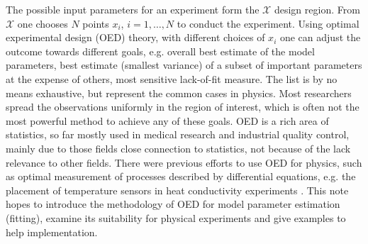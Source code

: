 \documentclass[12pt]{iopart}
\begin{document}
The possible input parameters for an experiment form the $\mathcal{X}$ design region. From $\mathcal{X}$ one chooses $N$ points $x_i$, $i = 1, \ldots, N$ to conduct the experiment. Using optimal experimental design (OED) theory, with different choices of $x_i$ one can adjust the outcome towards different goals, e.g. overall best estimate of the model parameters, best estimate (smallest variance) of a subset of important parameters at the expense of others, most sensitive lack-of-fit measure. The list is by no means exhaustive, but represent the common cases in physics. Most researchers spread the observations uniformly in the region of interest, which is often not the most powerful method to achieve any of these goals. OED is a rich area of statistics, so far mostly used in medical research and industrial quality control, mainly due to those fields close connection to statistics, not because of the lack relevance to other fields. There were previous efforts to use OED for physics, such as optimal measurement of processes described by differential equations, e.g. the placement of temperature sensors in heat conductivity experiments \cite{Emery1998}. This note hopes to introduce the methodology of OED for model parameter estimation (fitting), examine its suitability for physical experiments and give examples to help implementation.
\end{document}

